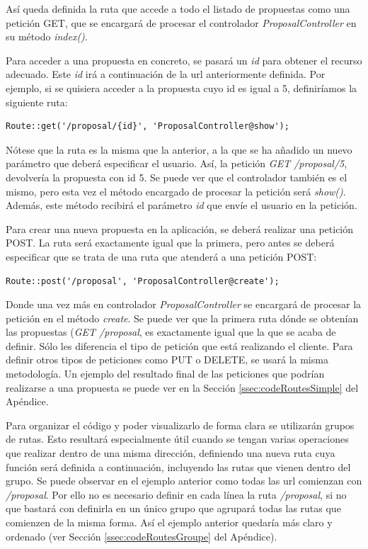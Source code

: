 Así queda definida la ruta que accede a todo el listado de propuestas como una petición GET, que se encargará de procesar el controlador \textit{ProposalController} en su método \textit{index()}.

Para acceder a una propuesta en concreto, se pasará un \textit{id} para obtener el recurso adecuado. Este \textit{id} irá a continuación de la url anteriormente definida. Por ejemplo, si se quisiera acceder a la propuesta cuyo id es igual a 5, definiríamos la siguiente ruta:

\lstset{
  language        = php}
  \begin{lstlisting}[frame=single]	
Route::get('/proposal/{id}', 'ProposalController@show');
\end{lstlisting}

Nótese que la ruta es la misma que la anterior, a la que se ha añadido un nuevo parámetro que deberá especificar el usuario. Así, la petición \textit{GET /proposal/5}, devolvería la propuesta con id 5. Se puede ver que el controlador también es el mismo, pero esta vez el método encargado de procesar la petición será \textit{show()}. Además, este método recibirá el parámetro \textit{{id}} que envíe el usuario en la petición.

Para crear una nueva propuesta en la aplicación, se deberá realizar una petición POST. La ruta será exactamente igual que la primera, pero antes se deberá especificar que se trata de una ruta que atenderá a una petición POST:

\lstset{
  language        = php}
\begin{lstlisting}[frame=single]	
Route::post('/proposal', 'ProposalController@create');
\end{lstlisting}

Donde una vez más en controlador \textit{ProposalController} se encargará de procesar la petición en el método \textit{create}. Se puede ver que la primera ruta dónde se obtenían las propuestas (\textit{GET /proposal}, es exactamente igual que la que se acaba de definir. Sólo les diferencia el tipo de petición que está realizando el cliente. Para definir otros tipos de peticiones como PUT o DELETE, se usará la misma metodología. Un ejemplo del resultado final de las peticiones que podrían realizarse a una propuesta se puede ver en la Sección \ref{ssec:codeRoutesSimple} del Apéndice.

Para organizar el código y poder visualizarlo de forma clara se utilizarán grupos de rutas. Esto resultará especialmente útil cuando se tengan varias operaciones que realizar dentro de una misma dirección, definiendo una nueva ruta cuya función será definida a continuación, incluyendo las rutas que vienen dentro del grupo. Se puede observar en el ejemplo anterior como todas las url comienzan con \textit{/proposal}. Por ello no es necesario definir en cada línea la ruta \textit{/proposal}, si no que bastará con definirla en un único grupo que agrupará todas las rutas que comienzen de la misma forma. Así el ejemplo anterior quedaría más claro y ordenado (ver Sección \ref{ssec:codeRoutesGroupe} del Apéndice).

